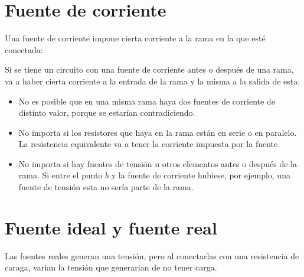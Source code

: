 \documentclass[a5paper,12pt,twoside]{book}
\begin{document}
\section{Fuente de corriente}

Una fuente de corriente impone cierta corriente a la rama en la que esté conectada:

\begin{center}
    \def\svgwidth{0.5\linewidth}
    
\end{center}

Si se tiene un circuito con una fuente de corriente antes o después de una rama, va a haber cierta corriente a la entrada de la rama y la misma a la salida de esta:

\begin{itemize}
\item No es posible que en una misma rama haya dos fuentes de corriente de distinto valor, porque se estarían contradiciendo.

\item No importa si los resistores que haya en la rama están en serie o en paralelo. La resistencia equivalente va a tener la corriente impuesta por la fuente.

\begin{multicols}{2}
    \begin{center}
        \def\svgwidth{0.9\linewidth}
        
    \end{center}
    \begin{center}
        \def\svgwidth{0.9\linewidth}
        
    \end{center}
\end{multicols}

\item No importa si hay fuentes de tensión u otros elementos antes o después de la rama. Si entre el punto $b$ y la fuente de corriente hubiese, por ejemplo, una fuente de tensión esta no sería parte de la rama.
\end{itemize}


\section{Fuente ideal y fuente real}

Las fuentes reales generan una tensión, pero al conectarlas con una resistencia de caraga, varian la tensión que generarian de no tener carga.
\end{document}
